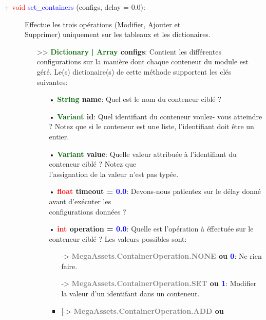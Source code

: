 \documentclass[a4paper, 11pt]{article}
\begin{document}
	\begin{description}
		\item [+ \textcolor{red}{void} \textcolor{blue}{set\_containers} (configs, delay = 0.0):] Effectue
		les trois opérations (Modifier, Ajouter et \\Supprimer) uniquement sur les tableaux et les
		dictionaires.
		\begin{itemize}
			\item [>> \textbf{\textcolor{darkgreen}{Dictionary | Array} configs}:] Contient les différentes
			configurations sur la manière dont chaque conteneur du module est géré. Le(s) dictionaire(s) de 
			cette méthode supportent les clés \\suivantes:
			\begin{itemize}
			   \item[• \textbf{\textcolor{darkgreen}{String} name}:] Quel est le nom du conteneur ciblé ?\\
			   \item[• \textbf{\textcolor{darkgreen}{Variant} id}:] Quel identifiant du conteneur voulez-
			   vous atteindre ? Notez que si le conteneur est une liste, l'identifiant doit être un entier.
			   \\\item[• \textbf{\textcolor{darkgreen}{Variant} value}:] Quelle valeur attribuée à
			   l'identifiant du conteneur ciblé ? Notez que \\l'assignation de la valeur n'est pas typée.\\
			   \item[• \textbf{\textcolor{red}{float} timeout = \textcolor{blue}{0.0}}:] Devons-nous 
			   patientez sur le délay donné avant d'exécuter les \\configurations données ?\\
			   \item[• \textbf{\textcolor{red}{int} operation = \textcolor{blue}{0.0}}:] Quelle est 
			   l'opération à éffectuée sur le conteneur ciblé ? Les valeurs possibles sont:
			   \begin{itemize}
			   		\item [-> \textbf{\textcolor{gray}{MegaAssets.ContainerOperation.NONE} ou
			   		\textcolor{blue}{0}}:] Ne rien faire.
					\item [-> \textbf{\textcolor{gray}{MegaAssets.ContainerOperation.SET} ou
					\textcolor{blue}{1}}:] Modifier la valeur d'un identifant dans un conteneur.
					\item [-> \textbf{\textcolor{gray}{MegaAssets.ContainerOperation.ADD} ou
}
\end{itemize}
\end{itemize}
\end{itemize}
\end{description}
\end{document}
